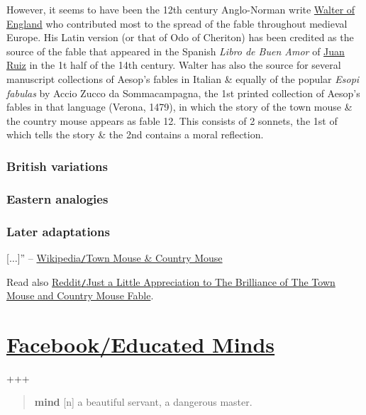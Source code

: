 \documentclass{article}
\begin{document}
However, it seems to have been the 12th century Anglo-Norman write \href{https://en.wikipedia.org/wiki/Walter_of_England}{Walter of England} who contributed most to the spread of the fable throughout medieval Europe. His Latin version (or that of Odo of Cheriton) has been credited as the source of the fable that appeared in the Spanish {\it Libro de Buen Amor} of \href{https://en.wikipedia.org/wiki/Juan_Ruiz}{\sc Juan Ruiz} in the 1t half of the 14th century. Walter has also the source for several manuscript collections of Aesop's fables in Italian \& equally of the popular {\it Esopi fabulas} by Accio Zucco da Sommacampagna, the 1st printed collection of Aesop's fables in that language (Verona, 1479), in which the story of the town mouse \& the country mouse appears as fable 12. This consists of 2 sonnets, the 1st of which tells the story \& the 2nd contains a moral reflection.

\subsubsection{British variations}

\subsubsection{Eastern analogies}

\subsubsection{Later adaptations}
[$\ldots$]'' -- \href{https://en.wikipedia.org/wiki/The_Town_Mouse_and_the_Country_Mouse}{Wikipedia{\tt/}Town Mouse \& Country Mouse}

Read also \href{https://www.reddit.com/r/ChainsawMan/comments/ghj22b/just_a_little_appreciation_to_the_brilliance_of/}{Reddit{\tt/}Just a Little Appreciation to The Brilliance of The Town Mouse and Country Mouse Fable}.


\section{\href{https://www.facebook.com/EducatedMindsPage}{Facebook/Educated Minds}}

+++
\begin{abstract}
	\textbf{mind} [n] a beautiful servant, a dangerous master.
\end{abstract}
\end{document}
